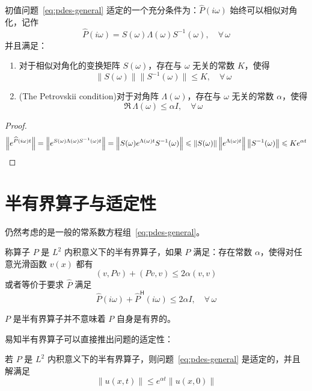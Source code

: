 \begin{theorem}\label{thm:well-posed-5}
    初值问题~\eqref{eq:pdes-general} 适定的一个充分条件为：$\widehat{P}(i \omega)$ 始终可以相似对角化，记作
    \[
        \widehat{P}(i \omega) = S(\omega ) \Lambda(\omega ) S^{-1}(\omega ),\quad \forall\,\omega
    \]
    并且满足：
    \begin{enumerate}
        \item 对于相似对角化的变换矩阵 $S(\omega )$，存在与 $\omega $ 无关的常数 $K$，使得
              \[
                  \| S(\omega ) \| \| S^{-1}(\omega ) \| \le K,\quad \forall\,\omega
              \]
        \item (The Petrovskii condition)对于对角阵 $\Lambda(\omega )$，存在与 $\omega $ 无关的常数 $\alpha$，使得
              \[
                  \Re \,\Lambda(\omega ) \le \alpha I,\quad \forall\,\omega
              \]
    \end{enumerate}
\end{theorem}

\begin{proof}
    \[
        \left\| e^{\widehat{P}(i \omega )t} \right\| = \left\| e^{S(\omega ) \Lambda(\omega ) S^{-1}(\omega )t} \right\|
        =
        \left\|S(\omega ) e^{\Lambda(\omega ) t}S^{-1}(\omega ) \right\| \le \left\|S(\omega )\right\| \left\|e^{\Lambda(\omega ) t}\right\| \left\|S^{-1}(\omega ) \right\|
        \le K e^{\alpha t} \qedhere
    \]
\end{proof}


\section{半有界算子与适定性}

仍然考虑的是一般的常系数方程组~\eqref{eq:pdes-general}。

\begin{definition}
    称算子 $P$ 是 $L^2$ 内积意义下的半有界算子，如果 $P$ 满足：存在常数 $\alpha$，使得对任意光滑函数 $v(x)$ 都有
    \[
        (v,Pv)+(Pv,v) \le 2\alpha (v,v)
    \]
    或者等价于要求 $\widehat{P}$ 满足
    \[
        \widehat{P}(i \omega) + \widehat{P}^{\mathsf{H}}(i \omega) \le 2 \alpha I,\quad \forall\,\omega
    \]
\end{definition}

\begin{remark}
    $P$ 是半有界算子并不意味着 $P$ 自身是有界的。
\end{remark}


易知半有界算子可以直接推出问题的适定性：
\begin{theorem}\label{thm:well-posed-6}
    若 $P$ 是 $L^2$ 内积意义下的半有界算子，则问题~\eqref{eq:pdes-general} 是适定的，并且解满足
    \[
        \| u(x,t) \| \le e^{\alpha t} \| u(x,0) \|
    \]
\end{theorem}

